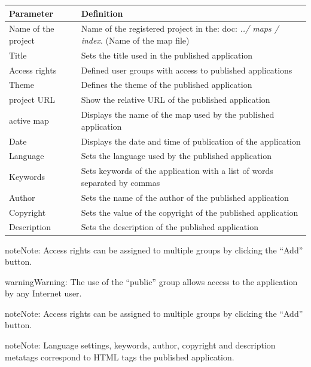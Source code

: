 \documentclass[letterpaper,10pt,english]{sphinxmanual}
\begin{document}
\begin{tabulary}{\linewidth}{|L|L|}
\hline

\textbf{Parameter}
 & 
\textbf{Definition}
\\
\hline
Name of the project
 & 
Name of the registered project in the: doc: \emph{../ maps / index}. (Name of the map file)
\\
\hline
Title
 & 
Sets the title used in the published application
\\
\hline
Access rights
 & 
Defined user groups with access to published applications
\\
\hline
Theme
 & 
Defines the theme of the published application
\\
\hline
project  URL
 & 
Show the relative URL of the published application
\\
\hline
active map
 & 
Displays the name of the map used by the published application
\\
\hline
Date
 & 
Displays the date and time of publication of the application
\\
\hline
Language
 & 
Sets the language used by the published application
\\
\hline
Keywords
 & 
Sets keywords of the application with a list of words separated by commas
\\
\hline
Author
 & 
Sets the name of the author of the published application
\\
\hline
Copyright
 & 
Sets the value of the copyright of the published application
\\
\hline
Description
 & 
Sets the description of the published application
\\
\hline\end{tabulary}


\begin{notice}{note}{Note:}
Access rights can be assigned to multiple groups by clicking the ``Add'' button.
\end{notice}

\begin{notice}{warning}{Warning:}
The use of the ``public'' group allows access to the application by any Internet user.
\end{notice}

\begin{notice}{note}{Note:}
Access rights can be assigned to multiple groups by clicking the ``Add'' button.
\end{notice}

\begin{notice}{note}{Note:}
Language settings, keywords, author, copyright and description metatags correspond to HTML tags the published application.
\end{notice}
\end{document}
